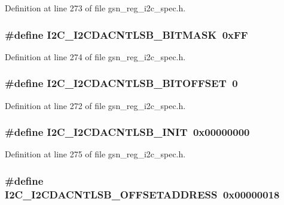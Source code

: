 Definition at line 273 of file gsn\_\-reg\_\-i2c\_\-spec.h.

\hypertarget{a00558_a3502600842755c9d2be4dd556b753d4a}{
\subsubsection[{I2C\_\-I2CDACNTLSB\_\-BITMASK}]{\setlength{\rightskip}{0pt plus 5cm}\#define I2C\_\-I2CDACNTLSB\_\-BITMASK~0xFF}}
\label{a00558_a3502600842755c9d2be4dd556b753d4a}


Definition at line 274 of file gsn\_\-reg\_\-i2c\_\-spec.h.

\hypertarget{a00558_aaf98189dc8844d96948a2a10667a6237}{
\subsubsection[{I2C\_\-I2CDACNTLSB\_\-BITOFFSET}]{\setlength{\rightskip}{0pt plus 5cm}\#define I2C\_\-I2CDACNTLSB\_\-BITOFFSET~0}}
\label{a00558_aaf98189dc8844d96948a2a10667a6237}


Definition at line 272 of file gsn\_\-reg\_\-i2c\_\-spec.h.

\hypertarget{a00558_a9789fbd6189dbc9d32ec3b46e7800f02}{
\subsubsection[{I2C\_\-I2CDACNTLSB\_\-INIT}]{\setlength{\rightskip}{0pt plus 5cm}\#define I2C\_\-I2CDACNTLSB\_\-INIT~0x00000000}}
\label{a00558_a9789fbd6189dbc9d32ec3b46e7800f02}


Definition at line 275 of file gsn\_\-reg\_\-i2c\_\-spec.h.

\hypertarget{a00558_acb72fef5f6cdc6410270736171b4b242}{
\subsubsection[{I2C\_\-I2CDACNTLSB\_\-OFFSETADDRESS}]{\setlength{\rightskip}{0pt plus 5cm}\#define I2C\_\-I2CDACNTLSB\_\-OFFSETADDRESS~0x00000018}}
\label{a00558_acb72fef5f6cdc6410270736171b4b242}


